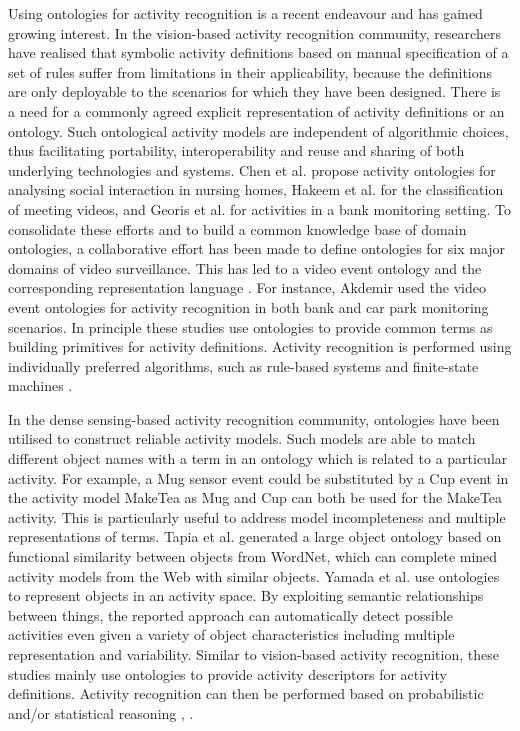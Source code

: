 Using ontologies for activity recognition is a recent endeavour and has gained growing interest. In the vision-based activity recognition community, researchers have realised that symbolic activity definitions based on manual specification of a set of rules suffer from limitations in their applicability, because the definitions are only deployable to the scenarios for which they have been designed. There is a need for a commonly agreed explicit representation of activity definitions or an ontology. Such ontological activity models are independent of algorithmic choices, thus facilitating portability, interoperability and reuse and sharing of both underlying technologies and systems. Chen et al. \cite{Chen2004} propose activity ontologies for analysing social interaction in nursing homes, Hakeem et al. \cite{Hakeem2004} for the classification of meeting videos, and Georis et al. \cite{Georis2004} for activities in a bank monitoring setting. To consolidate these efforts and to build a common knowledge base of domain ontologies, a collaborative effort has been made to define ontologies for six major domains of video surveillance. This has led to a video event ontology \cite{Nevatia2004} and the corresponding representation language \cite{Francois2005}. For instance, Akdemir \cite{Akdemir2008} used the video event ontologies for activity recognition in both bank and car park monitoring scenarios. In principle these studies use ontologies to provide common terms as building primitives for activity definitions. Activity recognition is performed using individually preferred algorithms, such as rule-based systems \cite{Hakeem2004} and finite-state machines \cite{Akdemir2008}. 

In the dense sensing-based activity recognition community, ontologies have been utilised to construct reliable activity models. Such models are able to match different object names with a term in an ontology which is related to a particular activity. For example, a Mug sensor event could be substituted by a Cup event in the activity model MakeTea as Mug and Cup can both be used for the MakeTea activity. This is particularly useful to address model incompleteness and multiple representations of terms. Tapia et al. \cite{Tapia2006} generated a large object ontology based on functional similarity between objects from WordNet, which can complete mined activity models from the Web with similar objects. Yamada et al. \cite{Yamada2007} use ontologies to represent objects in an activity space. By exploiting semantic relationships between things, the reported approach can automatically detect possible activities even given a variety of object characteristics including multiple representation and variability. Similar to vision-based activity recognition, these studies mainly use ontologies to provide activity descriptors for activity definitions. Activity recognition can then be performed based on probabilistic and/or statistical reasoning \cite{Tapia2006}, \cite{Yamada2007}.

